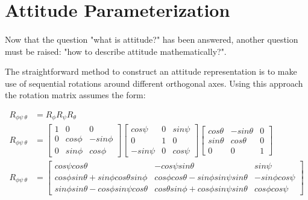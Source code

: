 \section{Attitude Parameterization}

\paragraph{}
\indent
	Now that the question "what is attitude?" has been answered, another question must be raised: "how to describe attitude mathematically?". 

\indent
	The straightforward method to construct an attitude representation is to make use of sequential rotations around different orthogonal axes. Using this approach the rotation matrix assumes the form:

\begin{align}
	R_{\phi \psi \ \theta} &= R_{\phi}R_{\psi}R_{\theta} \\
	R_{\phi \psi \ \theta} &= \begin{bmatrix}  1 & 0 & 0 \\ 0  & cos\phi  & -sin\phi \\  0 & sin \phi & cos \phi \end{bmatrix} \begin{bmatrix}  cos\psi & 0 & sin\psi \\ 0  & 1  & 0 \\  -sin \psi & 0 & cos \psi \end{bmatrix} \begin{bmatrix}  cos \theta & -sin \theta & 0 \\ sin \theta  & cos\theta  & 0 \\  0 & 0 & 1 \end{bmatrix}\\
	R_{\phi \psi \ \theta} &= \begin{bmatrix}  cos\psi cos\theta & -cos\psi sin\theta & sin\psi \\ cos\phi sin\theta + sin\phi cos\theta sin\phi & cos \phi cos \theta - sin \phi sin\psi sin\theta & -sin\phi cos\psi \\ sin\phi sin\theta - cos\phi sin\psi cos\theta & cos\theta sin\phi + cos\phi sin\psi sin\theta & cos\phi cos\psi    \end{bmatrix}
\end{align}

